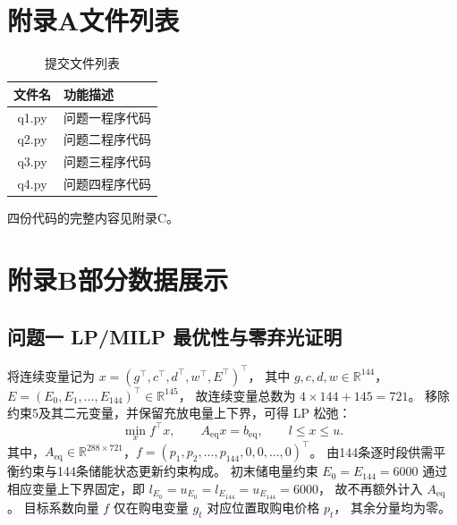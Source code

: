 \newpage
\section*{附录A\quad 文件列表}
\begin{table}[H]
  \centering
  \caption{提交文件列表}
  \label{tab:appendix-files}
  \begin{tabular}{cl}
    \toprule
    文件名 & 功能描述 \\
    \midrule
    q1.py & 问题一程序代码 \\
    q2.py & 问题二程序代码 \\
    q3.py & 问题三程序代码 \\
    q4.py & 问题四程序代码 \\
    \bottomrule
  \end{tabular}
\end{table}
四份代码的完整内容见附录C。

\section*{附录B\quad 部分数据展示}

\subsection*{问题一 LP/MILP 最优性与零弃光证明}

将连续变量记为 $x=(g^\top,c^\top,d^\top,w^\top,E^\top)^\top$，
其中 $g,c,d,w\in\mathbb{R}^{144}$，
$E=(E_0,E_1,\ldots,E_{144})^\top\in\mathbb{R}^{145}$，
故连续变量总数为 $4\times144+145=721$。
移除约束5及其二元变量，并保留充放电量上下界，可得 LP 松弛：
\begin{equation}
\min_x f^\top x,
\qquad
A_{\mathrm{eq}}x=b_{\mathrm{eq}},
\qquad
l\le x\le u.
\end{equation}
其中，$A_{\mathrm{eq}}\in\mathbb{R}^{288\times721}$，$f=\left(p_1,p_2,\ldots,p_{144},0,0,\ldots,0\right)^\top$。
由144条逐时段供需平衡约束与144条储能状态更新约束构成。
初末储电量约束 $E_0=E_{144}=6000$
通过相应变量上下界固定，即
$l_{E_0}=u_{E_0}=l_{E_{144}}=u_{E_{144}}=6000$，
故不再额外计入 $A_{\mathrm{eq}}$。
目标系数向量 $f$ 仅在购电变量 $g_t$ 对应位置取购电价格 $p_t$，
其余分量均为零。

